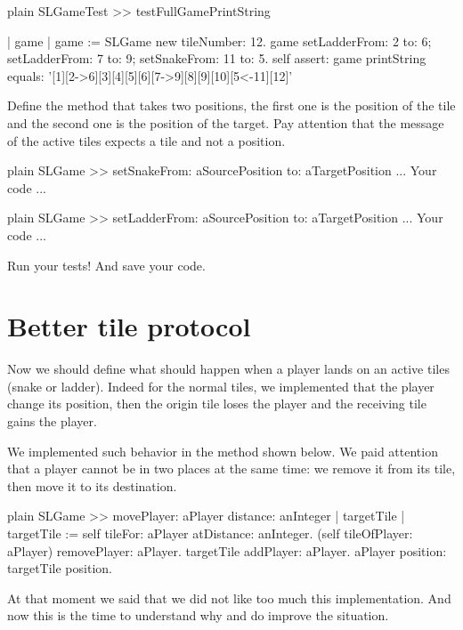 \documentclass[10pt,twoside,english]{_support/latex/sbabook/sbabook}
\begin{document}
\begin{displaycode}{plain}
SLGameTest >> testFullGamePrintString

	| game |
	game := SLGame new tileNumber: 12.
	game
		setLadderFrom: 2 to: 6;
		setLadderFrom: 7 to: 9;
		setSnakeFrom: 11 to: 5.
	self 
		assert: game printString 
		equals: '[1][2->6][3][4][5][6][7->9][8][9][10][5<-11][12]'
\end{displaycode}

Define the method  that takes two positions, the first one is the position of the tile and the second one is the position of the target. Pay attention that the message  of the active tiles expects a tile and not a position. 

\begin{displaycode}{plain}
SLGame >> setSnakeFrom: aSourcePosition to: aTargetPosition
	... Your code ...
\end{displaycode}

\begin{displaycode}{plain}
SLGame >> setLadderFrom: aSourcePosition to: aTargetPosition
	... Your code ...
\end{displaycode}

Run your tests! And save your code. 
\section{Better tile protocol}
Now we should define what should happen when a player lands on an active tiles (snake or ladder). Indeed for the normal tiles, we implemented that the player change its position, then the origin tile loses the player and the receiving tile gains the player. 

We implemented such behavior in the method  shown below. We paid attention that a player cannot be in two places at the same time: we remove it from its tile, then move it to its destination.

\begin{displaycode}{plain}
SLGame >> movePlayer: aPlayer distance: anInteger
	| targetTile |
	targetTile := self tileFor: aPlayer atDistance: anInteger.
	(self tileOfPlayer: aPlayer) removePlayer: aPlayer.
	targetTile addPlayer: aPlayer.
	aPlayer position: targetTile position.
\end{displaycode}

At that moment we said that we did not like too much this implementation. And now this is the time 
to understand why and do improve the situation. 
\end{document}
